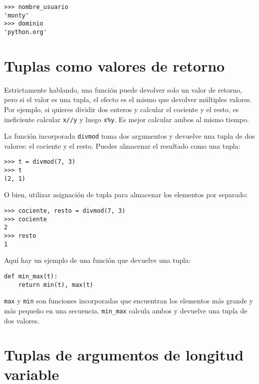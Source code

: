 \documentclass[10pt]{book}
\begin{document}
\begin{verbatim}
>>> nombre_usuario
'monty'
>>> dominio
'python.org'
\end{verbatim}
%

\section{Tuplas como valores de retorno}

Estrictamente hablando, una función puede devolver solo un valor de retorno, pero
si el valor es una tupla, el efecto es el mismo que devolver
múltiples valores.  Por ejemplo, si quieres dividir dos enteros
y calcular el cociente y el resto, es ineficiente
calcular {\tt x//y} y luego {\tt x\%y}.  Es mejor calcular
ambos al mismo tiempo.

La función incorporada {\tt divmod} toma dos argumentos y
devuelve una tupla de dos valores: el cociente y el resto.
Puedes almacenar el resultado como una tupla:

\begin{verbatim}
>>> t = divmod(7, 3)
>>> t
(2, 1)
\end{verbatim}
%
O bien, utilizar asignación de tupla para almacenar los elementos por separado:

\begin{verbatim}
>>> cociente, resto = divmod(7, 3)
>>> cociente
2
>>> resto
1
\end{verbatim}
%
Aquí hay un ejemplo de una función que devuelve una tupla:

\begin{verbatim}
def min_max(t):
    return min(t), max(t)
\end{verbatim}
%
{\tt max} y {\tt min} son funciones incorporadas que encuentran
los elementos más grande y más pequeño en una secuencia.  \verb"min_max"
calcula ambos y devuelve una tupla de dos valores.


\section{Tuplas de argumentos de longitud variable}
\label{gather}
\end{document}
